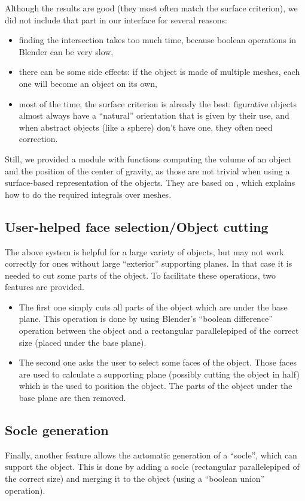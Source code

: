 \documentclass{report}
\begin{document}
	Although the results are good (they most often match the surface criterion), we did not include that part in our interface for several reasons:
	\begin{itemize}
		\item finding the intersection takes too much time, because boolean operations in Blender can be very slow,
		\item there can be some side effects: if the object is made of multiple meshes, each one will become an object on its own,
		\item most of the time, the surface criterion is already the best: figurative objects almost always have a “natural” orientation that is given by their use, and when abstract objects (like a sphere) don't have one, they often need correction.
	\end{itemize}

	Still, we provided a module with functions computing the volume of an object and the position of the center of gravity, as those are not trivial when using a surface-based representation of the objects. They are based on \cite{Liris-2411}, which explains how to do the required integrals over meshes.

\subsection{User-helped face selection/Object cutting}\label{sec:cutting}
The above system is helpful for a large variety of objects, but may not work correctly for ones without large ``exterior'' supporting planes. In that case it is needed to cut some parts of the object. To facilitate these operations, two features are provided.

\begin{itemize}
\item The first one simply cuts all parts of the object which are under the base plane. This operation is done by using Blender’s ``boolean difference'' operation between the object and a rectangular parallelepiped of the correct size (placed under the base plane).
\item The second one asks the user to select some faces of the object. Those faces are used to calculate a supporting plane (possibly cutting the object in half) which is the used to position the object. The parts of the object under the base plane are then removed.
\end{itemize}

\subsection{Socle generation}\label{sec:socle}
Finally, another feature allows the automatic generation of a “socle”, which can support the object. This is done by adding a socle (rectangular parallelepiped of the correct size) and merging it to the object (using a “boolean union” operation).
\end{document}
